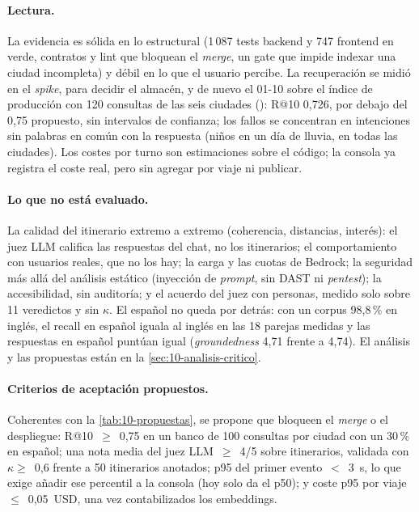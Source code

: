 \paragraph{Lectura.} La evidencia es sólida en lo estructural (1\,087 tests backend y 747
frontend en verde, contratos y lint que bloquean el \emph{merge}, un gate que impide indexar una
ciudad incompleta) y débil en lo que el usuario percibe. La recuperación se midió en el
\emph{spike}, para decidir el almacén, y de nuevo el 01-10 sobre el índice de producción con 120
consultas de las seis ciudades (): R@10 0,726, por
debajo del 0,75 propuesto, sin intervalos de confianza; los fallos se concentran en intenciones
sin palabras en común con la respuesta (niños en un día de lluvia, en todas las ciudades). Los
costes por turno son estimaciones sobre el código; la consola ya registra el coste real, pero sin
agregar por viaje ni publicar.

\paragraph{Lo que no está evaluado.} La calidad del itinerario extremo a extremo (coherencia,
distancias, interés): el juez LLM califica las respuestas del chat, no los itinerarios; el
comportamiento con usuarios reales, que no los hay; la carga y las cuotas de Bedrock; la seguridad
más allá del análisis estático (inyección de \emph{prompt}, sin DAST ni \emph{pentest}); la
accesibilidad, sin auditoría; y el acuerdo del juez con personas, medido solo sobre 11 veredictos
y sin $\kappa$. El español no queda por detrás: con un corpus 98,8\,\% en inglés, el recall en
español iguala al inglés en las 18 parejas medidas y las respuestas en español puntúan igual
(\emph{groundedness} 4,71 frente a 4,74). El análisis y las propuestas están en la
\cref{sec:10-analisis-critico}.

\paragraph{Criterios de aceptación propuestos.} Coherentes con la \cref{tab:10-propuestas}, se
propone que bloqueen el \emph{merge} o el despliegue: R@10~$\geq$~0,75 en un banco de 100
consultas por ciudad con un 30\,\% en español; una nota media del juez LLM~$\geq$~4/5 sobre
itinerarios, validada con $\kappa\geq$~0,6 frente a 50 itinerarios anotados; p95 del primer
evento~$<$~3~s, lo que exige añadir ese percentil a la consola (hoy solo da el p50); y coste p95
por viaje~$\leq$~0,05~USD, una vez contabilizados los embeddings.
